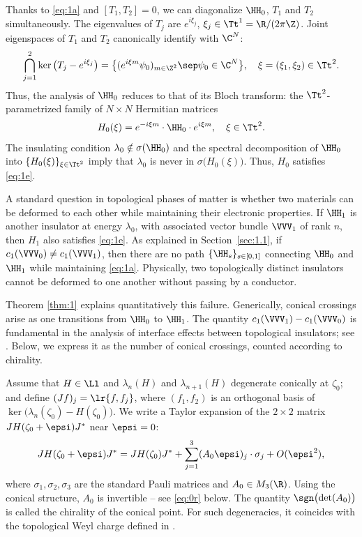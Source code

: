 Thanks to \eqref{eq:1a} and $[T_1,T_2] = 0$, we can diagonalize $\HH_0$, $T_1$ and $T_2$ simultaneously. The eigenvalues of $T_j$ are $e^{i\xi_j}$, $\xi_j \in \Tt^1 = \R/(2\pi \Z)$. Joint eigenspaces of $T_1$ and $T_2$ canonically identify with $\C^N$:
\begin{equation*}
\bigcap_{j=1}^2 \ker\left(T_j-e^{i\xi_j}\right) = \bigl\{(e^{i\xi m} \psi_0)_{m \in \Z^2} \sep \psi_0 \in \C^N\bigr\} , \quad \xi =(\xi_1,\xi_2) \in \Tt^2.
\end{equation*}
Thus, the analysis of $\HH_0$ reduces to that of its Bloch transform: the $\Tt^2$-parametrized family of $N \times N$ Hermitian matrices
\begin{equation}\label{eq:3b}
H_0(\xi) = e^{-i\xi m} \cdot \HH_0 \cdot e^{i\xi m}, \quad \xi \in \Tt^2.
\end{equation}
The insulating condition $\lambda_0 \notin \sigma(\HH_0)$ and the spectral decomposition of $\HH_0$ into $\{ H_0(\xi) \}_{\xi \in \Tt^2}$ imply that $\lambda_0$ is never in $\sigma\bigl( H_0(\xi) \bigr)$. Thus, $H_0$ satisfies \eqref{eq:1e}.

A standard question in topological phases of matter is whether two materials can be deformed to each other while maintaining their electronic properties. If $\HH_1$ is another insulator at energy $\lambda_0$, with associated vector bundle $\VVV_1$ of rank $n$, then $H_1$ also satisfies \eqref{eq:1e}. As explained in Section~\ref{sec:1.1}, if $c_1(\VVV_0) \neq c_1(\VVV_1)$, then there are no path $\{\HH_s\}_{s \in [0,1]}$ connecting $\HH_0$ and $\HH_1$ while maintaining \eqref{eq:1a}. Physically, two topologically distinct insulators cannot be deformed to one another without passing by a conductor.

Theorem \ref{thm:1} explains quantitatively this failure. Generically, conical crossings arise as one transitions from $\HH_0$ to $\HH_1$. The quantity $c_1(\VVV_1) - c_1(\VVV_0)$ is fundamental in the analysis of interface effects between topological insulators; see \eg \cite{RH08,B19b,D19c}. Below, we express it as the number of conical crossings, counted according to chirality.

Assume that $H \in \Ll$ and $\lambda_n(H)$ and $\lambda_{n+1}(H)$ degenerate conically at $\zeta_0$; and define $(J f)_j = \lr{f, f_j}$, where $(f_1,f_2)$ is an orthogonal basis of $\ker\bigl(\lambda_n(\zeta_0) -H(\zeta_0)\bigr)$. We write a Taylor expansion of the $2 \times 2$ matrix $J H(\zeta_0+\epsi) J^*$ near $\epsi = 0$:
\begin{equation}\label{eq:1g}
J H(\zeta_0+\epsi) J^* = J H(\zeta_0) J^* + \sum_{j=1}^3 (A_0 \epsi)_j \cdot \sigma_j + O(\epsi^2),
\end{equation}
where $\sigma_1, \sigma_2, \sigma_3$ are the standard Pauli matrices and $A_0 \in M_3(\R)$.
Using the conical structure, $A_0$ is invertible -- see \eqref{eq:0r} below. The quantity $\sgn\bigl(\det(A_0) \bigr)$ is called the chirality of the conical point. For such degeneracies, it coincides with the topological Weyl charge defined in \cite{MP14}.


